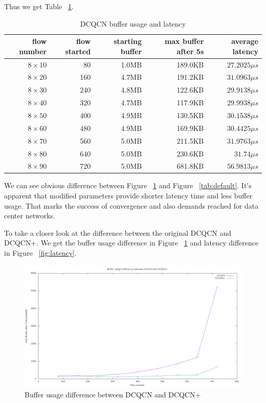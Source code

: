 \documentclass[12pt,a4paper]{article}
\begin{document}
Thus we get Table ~\ref{tab:improved}.

\begin{table}[h!]
	\begin{center}
		\caption{DCQCN buffer usage and latency}
		\label{tab:improved}
		\begin{tabular}{|r|r|r|r|r|}
			\hline
			flow number & flow started & starting buffer & max buffer after 5s & average latency\\
			\hline
			$8\times 10$ & 80 & 1.0MB & 189.0KB & $27.2025\mu s$\\
			\hline
			$8\times 20$ & 160 & 4.7MB & 191.2KB & $31.0963\mu s$\\
			\hline
			$8\times 30$ & 240 & 4.8MB & 122.6KB & $29.9138\mu s$\\
			\hline
			$8\times 40$ & 320 & 4.7MB & 117.9KB & $29.9938\mu s$\\
			\hline
			$8\times 50$ & 400 & 4.9MB & 130.5KB & $30.1538\mu s$\\
			\hline
			$8\times 60$ & 480 & 4.9MB & 169.9KB & $30.4425\mu s$\\
			\hline
			$8\times 70$ & 560 & 5.0MB & 211.5KB & $31.9763\mu s$\\
			\hline
			$8\times 80$ & 640 & 5.0MB & 230.6KB & $31.74\mu s$\\
			\hline
			$8\times 90$ & 720 & 5.0MB & 681.8KB & $56.9813\mu s$\\
			\hline
		\end{tabular}
	\end{center}
\end{table}

We can see obvious difference between Figure ~\ref{tab:improved} and Figure ~\ref{tab:default}.
It's apparent that modified parameters provide shorter latency time and less buffer usage.
That marks the success of convergence and also demands reached for data center networks.

To take a closer look at the difference between the original DCQCN and DCQCN+.
We get the buffer usage difference in Figure ~\ref{fig:buffer} and latency difference in Figure ~\ref{fig:latency}.

\begin{figure}[h!]
	\begin{center}
		\includegraphics[width=6in]{buffer}
		\caption{Buffer usage difference between DCQCN and DCQCN+}
		\label{fig:buffer}
	\end{center}
\end{figure}
\end{document}
